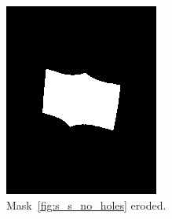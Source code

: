 \documentclass{article}
\begin{document}
\begin{figure}
\begin{subfigure}{0.3\textwidth}
    \includegraphics[width=\linewidth]{pictures/remove_knobs_erosion.png}
    \caption{Mask~\ref{fig:s_s_no_holes} eroded.}
    \label{fig:s_s_erosion}
  \end{subfigure}
  \hfill
  \begin{subfigure}{0.3\textwidth}
    \centering

\end{subfigure}
\end{figure}
\end{document}
